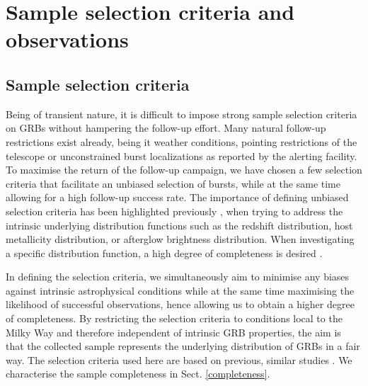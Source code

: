 \documentclass[longauth]{aa}    %
\begin{document}
\section{Sample selection criteria and observations}\label{sample}



\subsection{Sample selection criteria} \label{samplecrit}

Being of transient nature, it is difficult to impose strong sample selection
criteria on GRBs without hampering the follow-up effort. Many natural follow-up
restrictions exist already, being it weather conditions, pointing restrictions
of the telescope or unconstrained burst localizations as reported by the alerting
facility. To maximise the return of the follow-up campaign, we have chosen a
few selection criteria that facilitate an unbiased selection of bursts, while
at the same time allowing for a high follow-up success rate. The importance of
defining unbiased selection criteria has been highlighted previously
\citep{Jakobsson2006b, Salvaterra2012, Hjorth2012, Vergani2015, Perley2016a},
when trying to address the intrinsic underlying distribution functions such as
the redshift distribution, host metallicity distribution, or afterglow
brightness distribution. When investigating a specific distribution function, a
high degree of completeness is desired \citep[e.g.][]{Perley2016b}.

In defining the selection criteria, we simultaneously aim to minimise any biases
against intrinsic astrophysical conditions while at the same time maximising the
likelihood of successful observations, hence allowing us to obtain a higher
degree of completeness. By restricting the selection criteria to conditions
local to the Milky Way and therefore independent of intrinsic GRB properties,
the aim is that the collected sample represents the underlying distribution of
GRBs in a fair way. The selection criteria used here are based on previous,
similar studies \citep{Jakobsson2006b, Fynbo2009, Hjorth2012}. We characterise
the sample completeness in Sect. \ref{completeness}.
\end{document}
